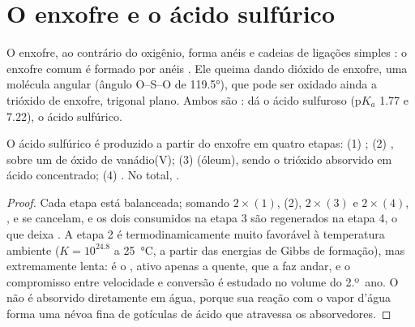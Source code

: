 \section{O enxofre e o ácido sulfúrico}

O enxofre, ao contrário do oxigênio, forma anéis e cadeias de ligações
simples : o enxofre comum é formado por anéis . Ele queima
dando dióxido de enxofre, uma molécula angular (ângulo O--S--O de
\ang{119.5}), que pode ser oxidado ainda a trióxido de enxofre, trigonal
plano. Ambos são :  dá o ácido sulfuroso
($\mathrm{p}K_a$ 1.77 e 7.22),  o ácido sulfúrico.

\begin{proposition}\label{prop:b1:p-block-16-18:contact-steps}
O ácido sulfúrico é produzido a partir do enxofre em quatro etapas:
(1) ; (2) , sobre um 
de óxido de vanádio(V); (3)  (óleum), sendo o
trióxido absorvido em ácido concentrado; (4) .
No total, .
\end{proposition}

\begin{proof}
Cada etapa está balanceada; somando $2\times(1)$, (2), $2\times(3)$ e
$2\times(4)$, ,  e  se cancelam, e os dois
 consumidos na etapa 3 são regenerados na etapa 4, o que deixa
. A etapa 2 é termodinamicamente muito
favorável à temperatura ambiente ($K = 10^{24.8}$ a \qty{25}{\celsius}, a
partir das energias de Gibbs de formação), mas extremamente lenta: é o
, ativo apenas a quente, que a faz andar, e o compromisso entre
velocidade e conversão é estudado no volume do 2.º~ano. O  não é
absorvido diretamente em água, porque sua reação com o vapor d'água forma
uma névoa fina de gotículas de ácido que atravessa os absorvedores.
\end{proof}

